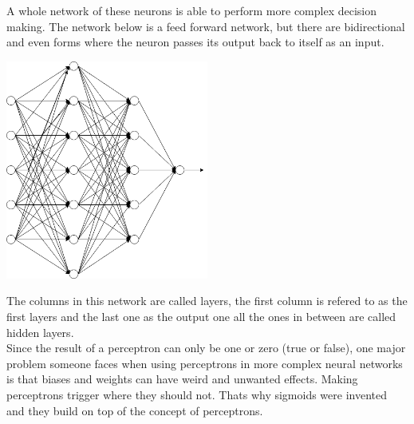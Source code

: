 A whole network of these neurons is able to perform more complex decision making. The network below is a feed forward network, but there are
bidirectional and even forms where the neuron passes its output back to itself as an input.
\begin{center}
    \includegraphics[width=0.5\textwidth]{images/neurons/neural_network.png}
\end{center}
\newpage \noindent
The columns in this network are called layers, the first column is refered to as the first layers and the last one as the output one all the
ones in between are called hidden layers. \\
Since the result of a perceptron can only be one or zero (true or false), one major problem someone faces when using perceptrons in more
complex neural networks is that biases and weights can have weird and unwanted effects. Making perceptrons trigger where they should not.
Thats why sigmoids were invented and they build on top of the concept of perceptrons.

